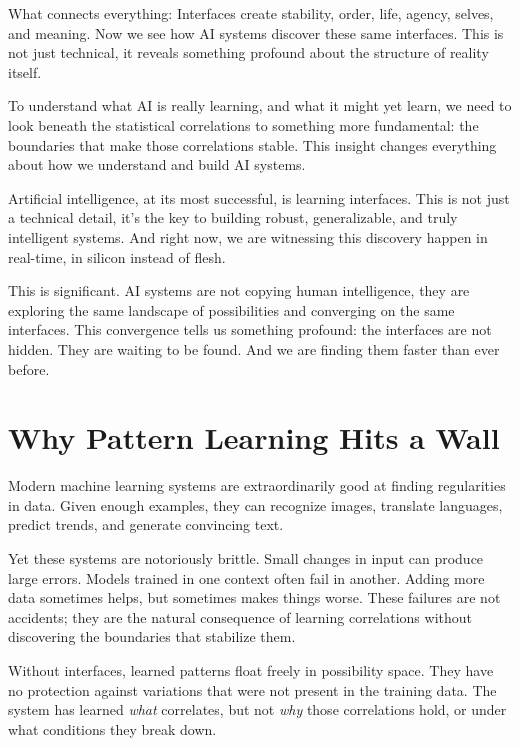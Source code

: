 \documentclass[
  openright]{book}
\begin{document}
What connects everything: Interfaces create stability, order, life,
agency, selves, and meaning. Now we see how AI systems discover these
same interfaces. This is not just technical, it reveals something
profound about the structure of reality itself.

To understand what AI is really learning, and what it might yet learn,
we need to look beneath the statistical correlations to something more
fundamental: the boundaries that make those correlations stable. This
insight changes everything about how we understand and build AI systems.

Artificial intelligence, at its most successful, is learning
interfaces. This is not just a technical
detail, it's the key to building robust, generalizable, and truly
intelligent systems. And right now, we are witnessing this discovery
happen in real-time, in silicon instead of flesh.

This is significant. AI systems are not copying human intelligence, they
are exploring the same landscape of possibilities and converging on the
same interfaces. This convergence tells us something profound: the
interfaces are not hidden. They are waiting to be found. And we are
finding them faster than ever before.

\section{Why Pattern Learning Hits a
Wall}\label{why-pattern-learning-hits-a-wall}

Modern machine learning systems are extraordinarily good at finding
regularities in data. Given enough examples, they can recognize images,
translate languages, predict trends, and generate convincing text.

Yet these systems are notoriously brittle. Small
changes in input can produce large errors. Models trained in one context
often fail in another. Adding more data sometimes helps, but sometimes
makes things worse. These failures are not accidents; they are the
natural consequence of learning correlations without discovering the
boundaries that stabilize them.

Without interfaces, learned patterns float freely in possibility space.
They have no protection against variations that were not present in the
training data. The system has learned \emph{what} correlates, but not
\emph{why} those correlations hold, or under what conditions they break
down.
\end{document}

